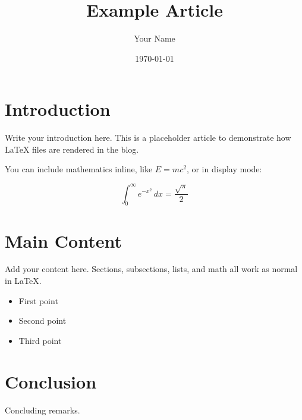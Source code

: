 \documentclass{article}
\title{Example Article}
\author{Your Name}
\date{\today}
\begin{document}
\maketitle

\section{Introduction}

Write your introduction here. This is a placeholder article to demonstrate
how \LaTeX{} files are rendered in the blog.

You can include mathematics inline, like $E = mc^2$, or in display mode:

\[
  \int_0^\infty e^{-x^2}\, dx = \frac{\sqrt{\pi}}{2}
\]

\section{Main Content}

Add your content here. Sections, subsections, lists, and math all work as
normal in \LaTeX{}.

\begin{itemize}
  \item First point
  \item Second point
  \item Third point
\end{itemize}

\section{Conclusion}

Concluding remarks.
\end{document}
